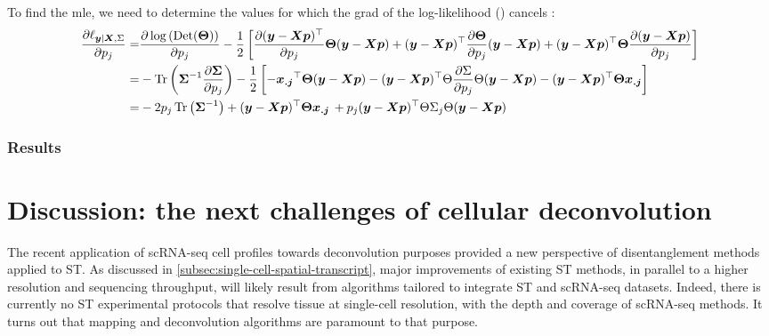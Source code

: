 To find the \gls{mle}, we need to determine the values for which the \gls{grad} of the log-likelihood () cancels : 
\begin{equation}
\label{eq:derivative-log-likelihood-reference}
\begin{split}
\frac{\partial \ell_{\boldsymbol{y} | \boldsymbol{X}, \Sigma}}{\partial p_j} =& \frac{\partial \log\left(\operatorname*{Det}(\boldsymbol{\Theta})\right)}{\partial p_j} -\frac{1}{2} \left[\frac{\partial (\boldsymbol{y} - \boldsymbol{X} \boldsymbol{p})^\top}{\partial p_j}\boldsymbol{\Theta}(\boldsymbol{y} - \boldsymbol{X} \boldsymbol{p}) + (\boldsymbol{y} - \boldsymbol{X} \boldsymbol{p})^\top\frac{\partial\boldsymbol{\Theta}}{\partial p_j}(\boldsymbol{y} - \boldsymbol{X} \boldsymbol{p}) + (\boldsymbol{y} - \boldsymbol{X} \boldsymbol{p})^\top\boldsymbol{\Theta} \frac{\partial (\boldsymbol{y} - \boldsymbol{X} \boldsymbol{p})}{\partial p_j} \right]\\
=&-\operatorname*{Tr} \left(\boldsymbol{\Sigma}^{-1} \frac{\partial \boldsymbol{\Sigma}}{\partial p_j} \right) - \frac{1}{2} \left[ - \boldsymbol{x_{.j}}^\top\boldsymbol{\Theta}(\boldsymbol{y} - \boldsymbol{X} \boldsymbol{p}) - (\boldsymbol{y} - \boldsymbol{X} \boldsymbol{p})^\top\Theta\frac{\partial \Sigma}{\partial p_j}\Theta(\boldsymbol{y} - \boldsymbol{X} \boldsymbol{p}) - (\boldsymbol{y} - \boldsymbol{X} \boldsymbol{p})^\top\boldsymbol{\Theta}  \boldsymbol{x_{.j}} \right] \\
=& -2p_j \operatorname*{Tr} \left(\boldsymbol{\Sigma}^{-1}\right) + (\boldsymbol{y} - \boldsymbol{X} \boldsymbol{p})^\top\boldsymbol{\Theta}  \boldsymbol{x_{.j}} \, + p_j (\boldsymbol{y} - \boldsymbol{X} \boldsymbol{p})^\top\Theta \Sigma_j \Theta (\boldsymbol{y} - \boldsymbol{X} \boldsymbol{p})
\end{split}
\end{equation}



\subsubsection{Results}

\section{Discussion: the next challenges of cellular deconvolution}
\label{sec:perspective-deconvolution}

The recent application of scRNA-seq cell profiles towards deconvolution purposes provided a new perspective of disentanglement methods applied to ST. As discussed in \ref{subsec:single-cell-spatial-transcript}, major improvements of existing ST methods, in parallel to a higher resolution and sequencing throughput, will likely result from algorithms tailored to integrate ST and scRNA-seq datasets. Indeed, there is currently no ST experimental protocols that resolve tissue at single-cell resolution, with the depth and coverage of scRNA-seq methods. It turns out that mapping and deconvolution algorithms are paramount to that purpose.


